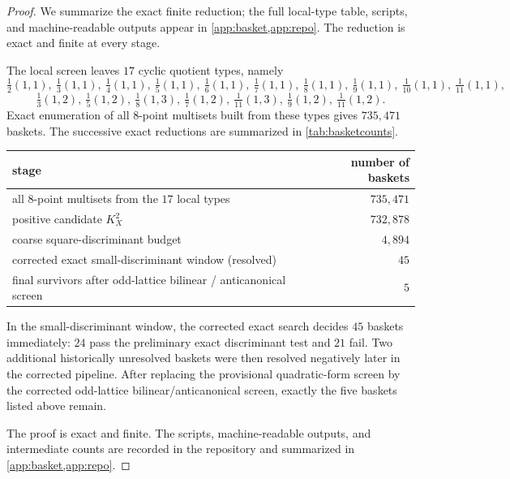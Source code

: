 \documentclass[11pt]{article}
\theoremstyle{definition}
\begin{document}
\begin{proof}
We summarize the exact finite reduction; the full local-type table, scripts, and machine-readable outputs appear in \cref{app:basket,app:repo}. The reduction is exact and finite at every stage.

The local screen leaves $17$ cyclic quotient types, namely
\[
\tfrac12(1,1),\ \tfrac13(1,1),\ \tfrac14(1,1),\ \tfrac15(1,1),\ \tfrac16(1,1),\ \tfrac17(1,1),\ \tfrac18(1,1),\ \tfrac19(1,1),\ \tfrac1{10}(1,1),\ \tfrac1{11}(1,1),
\]
\[
\tfrac13(1,2),\ \tfrac15(1,2),\ \tfrac18(1,3),\ \tfrac17(1,2),\ \tfrac1{11}(1,3),\ \tfrac19(1,2),\ \tfrac1{11}(1,2).
\]
Exact enumeration of all $8$-point multisets built from these types gives $735{,}471$ baskets. The successive exact reductions are summarized in \cref{tab:basketcounts}.

\begin{center}
\begin{tabular}{l r}
\toprule
stage & number of baskets \\
\midrule
all $8$-point multisets from the $17$ local types & $735{,}471$ \\
positive candidate $K_X^2$ & $732{,}878$ \\
coarse square-discriminant budget & $4{,}894$ \\
corrected exact small-discriminant window (resolved) & $45$ \\
final survivors after odd-lattice bilinear / anticanonical screen & $5$ \\
\bottomrule
\end{tabular}
\end{center}

\begin{table}[h]
\centering
\caption{Exact basket-reduction counts used in \cref{prop:final-baskets}.}
\label{tab:basketcounts}
\end{table}

In the small-discriminant window, the corrected exact search decides $45$ baskets immediately: $24$ pass the preliminary exact discriminant test and $21$ fail. Two additional historically unresolved baskets were then resolved negatively later in the corrected pipeline. After replacing the provisional quadratic-form screen by the corrected odd-lattice bilinear/anticanonical screen, exactly the five baskets listed above remain.

The proof is exact and finite. The scripts, machine-readable outputs, and intermediate counts are recorded in the repository and summarized in \cref{app:basket,app:repo}.
\end{proof}
\end{document}
